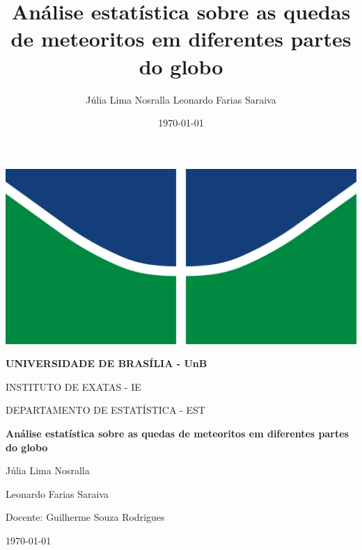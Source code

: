 \documentclass{article}
\title{Análise estatística sobre as quedas de meteoritos em diferentes partes do globo}
\author{
    Júlia Lima Nosralla
    Leonardo Farias Saraiva
}
\date{\today}
\begin{document}
\begin{titlepage}
    \centering

    \includegraphics[scale=0.02]{logo-unb.png} %
    
    \vspace*{0.5cm}
    {\large \textbf{UNIVERSIDADE DE BRASÍLIA - UnB} \par}
    {\large INSTITUTO DE EXATAS - IE \par}
    {\large DEPARTAMENTO DE ESTATÍSTICA - EST \par}

    \vfill

    {\LARGE \textbf{Análise estatística sobre as quedas de meteoritos em diferentes partes do globo} \par}
    \vspace{1.5cm}
        
    \vfill
    
    {\large Júlia Lima Nosralla \par}    
    \vspace{0.2cm}
    {\large Leonardo Farias Saraiva \par}
    
    \vfill

    {\large Docente: Guilherme Souza Rodrigues}

    \vfill

    {\large \today \par}
\end{titlepage}
\end{document}
